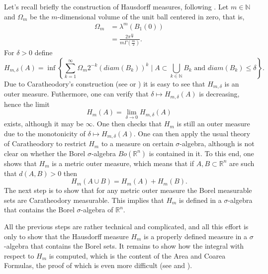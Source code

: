 \documentclass[%
 aip,
 amsmath,amssymb,
 reprint,%
jmp]{revtex4-2}
\begin{document}
Let's recall briefly the construction of Hausdorff measures, following \cite{Krantz}. Let $m\in\mathbb{N}$ and $\Omega_{m}$ be the $m$-dimensional volume of the unit ball centered in zero, that is,
\begin{align*}
    \Omega_{m} &= \lambda^{m}(B_{1}(0))\\
    &= \frac{2\pi^{\frac{m}{2}}}{m\Gamma(\frac{m}{2})}.
\end{align*}
For $\delta > 0$ define
\begin{equation*}
    H_{m,\delta}(A) = \inf\left\{\sum_{k=1}^{\infty}\Omega_{m}2^{-k}(diam(B_{k}))^{k}\;\bigg|\;A\subset \bigcup_{k\in\mathbb{N}}B_{k} \textrm{ and }diam(B_{k}) \leq \delta\right\}.
\end{equation*}
Due to Caratheodory's construction (see \cite{Federer} or \cite{Krantz}) it is easy to see that $H_{m,\delta}$ is an outer measure. Futhermore, one can verify that $\delta \longmapsto H_{m,\delta}(A)$ is decreasing, hence the limit
\begin{equation*}
    H_{m}(A) = \lim_{\delta\to 0}H_{m,\delta}(A)
\end{equation*}
exists, although it may be $\infty$. One then checks that $H_{m}$ is still an outer measure due to the monotonicity of $\delta \longmapsto H_{m,\delta}(A)$. One can then apply the usual theory of Caratheodory to restrict $H_{m}$ to a measure on certain $\sigma$-algebra, although is not clear on whether the Borel $\sigma$-algebra $Bo(\mathbb{R}^{n})$ is contained in it. To this end, one shows that $H_{m}$ is a metric outer measure, which means that if $A,B\subset\mathbb{R}^{n}$ are such that $d(A,B) > 0$ then
\begin{equation*}
    H_{m}(A\cup B) = H_{m}(A) + H_{m}(B).
\end{equation*}
The next step is to show that for any metric outer measure the Borel measurable sets are Caratheodory measurable. This implies that $H_{m}$ is defined in a $\sigma$-algebra that contains the Borel $\sigma$-algebra of $\mathbb{R}^{n}$.

All the previous steps are rather technical and complicated, and all this effort is only to show that the Hausdorff measure $H_{m}$ is a properly defined measure in a $\sigma$-algebra that contains the Borel sets. It remains to show how the integral with respect to $H_{m}$ is computed, which is the content of the Area and Coarea Formulas, the proof of which is even more difficult (see \cite{Krantz} and \cite{Evans}).
\end{document}
